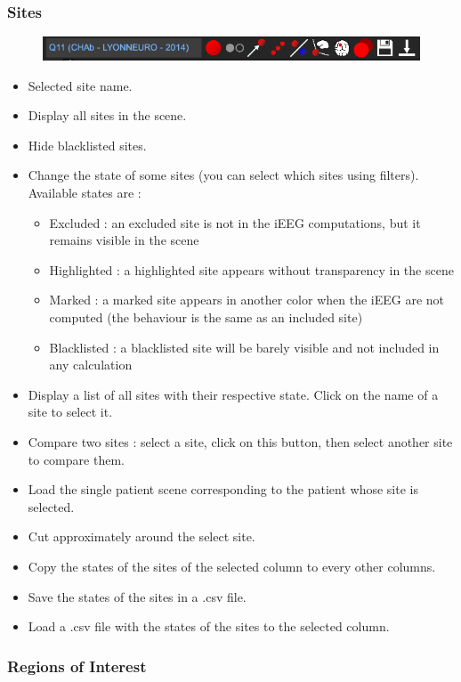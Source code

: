 \documentclass[a4paper]{article}
\begin{document}
\subsubsection{Sites}
\begin{figure}[H]
\begin{center}
\includegraphics[scale=0.45]{Sites.png}
\end{center}
\end{figure}
\begin{itemize}
\item Selected site name.
\item Display all sites in the scene.
\item Hide blacklisted sites.
\item Change the state of some sites (you can select which sites using filters). Available states are :
\begin{itemize}
\item Excluded : an excluded site is not in the iEEG computations, but it remains visible in the scene
\item Highlighted : a highlighted site appears without transparency in the scene
\item Marked : a marked site appears in another color when the iEEG are not computed (the behaviour is the same as an included site)
\item Blacklisted : a blacklisted site will be barely visible and not included in any calculation
\end{itemize}
\item Display a list of all sites with their respective state. Click on the name of a site to select it.
\item Compare two sites : select a site, click on this button, then select another site to compare them.
\item Load the single patient scene corresponding to the patient whose site is selected.
\item Cut approximately around the select site.
\item Copy the states of the sites of the selected column to every other columns.
\item Save the states of the sites in a .csv file.
\item Load a .csv file with the states of the sites to the selected column.
\end{itemize}
\subsubsection{Regions of Interest}
\end{document}
